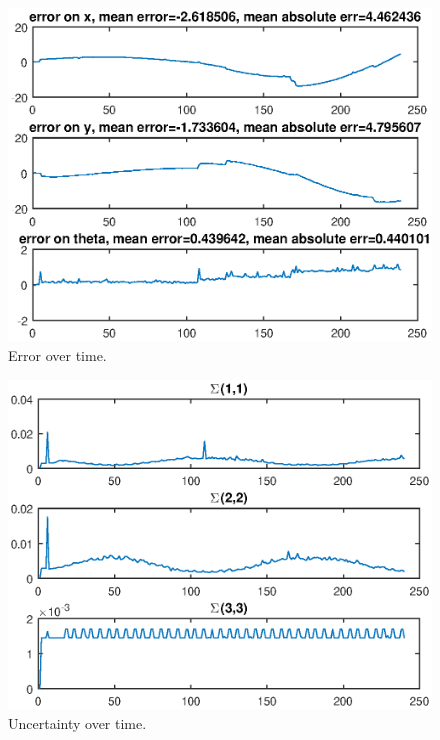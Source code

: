 \documentclass[12pt]{article}
\begin{document}
\begin{figure}[htbp]
 \centering
 \includegraphics[width=\textwidth]{test3_fig2}
 \caption{Error over time.}
\end{figure}
\begin{figure}[htbp]
 \centering
 \includegraphics[width=\textwidth]{test3_fig3}
 \caption{Uncertainty over time.}
\end{figure}
\end{document}
